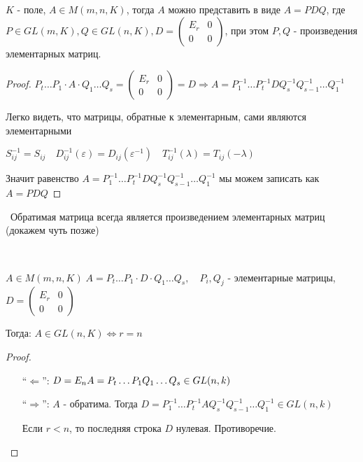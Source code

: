 \follow \; $K$ - поле, $A \in M(m, n, K)$, тогда $A$ можно представить в виде $A = PDQ$, где
$P \in GL(m, K), Q \in GL(n, K), D = \begin{pmatrix}
    E_r & 0 \\
    0 & 0
\end{pmatrix}$, при этом $P, Q$ - произведения элементарных матриц.
\begin{proof}
    $P_t \dots P_1 \cdot A \cdot Q_1 \dots Q_s = \begin{pmatrix}
        E_r & 0 \\
        0 & 0
    \end{pmatrix} = D \Longrightarrow A = P^{-1}_1 \dots P^{-1}_t D Q^{-1}_s Q^{-1}_{s-1} \dots Q^{-1}_{1}$

    Легко видеть, что матрицы, обратные к элементарным, сами являются элементарными

    $S^{-1}_{ij} = S_{ij} \quad D^{-1}_{ij}(\varepsilon) = D_{ij}(\varepsilon^{-1}) \quad T^{-1}_{ij}(\lambda) = T_{ij}(-\lambda)$

    Значит равенство $A = P^{-1}_1 \dots P^{-1}_t D Q^{-1}_s Q^{-1}_{s-1} \dots Q^{-1}_{1}$ мы можем записать 
    как $A = PDQ$
\end{proof}
\
\notice Обратимая матрица всегда является произведением элементарных матриц (докажем чуть позже)

\

\follow \; $A \in M(m, n, K) \; A = P_t \dots P_1 \cdot D \cdot Q_1 \dots Q_s, \quad P_i, Q_j $ - элементарные матрицы, $D = \begin{pmatrix}
    E_r & 0 \\
    0 & 0
\end{pmatrix}$

Тогда: $A \in GL(n, K) \Longleftrightarrow r = n$

\begin{proof} \quad

    \begin{itemize}
        \item[``$\Longleftarrow$'':] $D = E_n \\
            A = P_t \dots P_1 Q_1 \dots Q_s \in GL(n, k)$
        \item[``$\Longrightarrow$'':] $A$ - обратима. Тогда $D = P^{-1}_1 \dots P^{-1}_t A Q^{-1}_s Q^{-1}_{s-1} \dots Q^{-1}_{1} \in GL(n, k)$
            
            Если $r < n$, то последняя строка $D$ нулевая. Противоречие.
    \end{itemize}
\end{proof}

